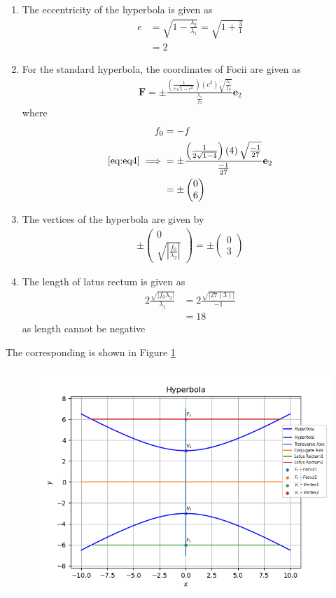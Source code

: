 \documentclass[12pt]{article}
\providecommand{\brak}[1]{\ensuremath{\left(#1\right)}}
\providecommand{\abs}[1]{\left\vert#1\right\vert}
\newcommand{\myvec}[1]{\ensuremath{\begin{pmatrix}#1\end{pmatrix}}}
\let\vec\mathbf
\begin{document}
\begin{enumerate}
\item The eccentricity of the hyperbola is given as
\begin{align}
	e &= \sqrt{1 - \frac{\lambda_2}{\lambda_1}} = \sqrt{1+\frac{3}{1}}\\
	  &= 2
\end{align}
\item For the standard hyperbola, the coordinates of Focii are given as
\begin{align}
	\label{eq:eq4}
	\vec{F} = \pm \frac{\brak{\frac{1}{e\sqrt{1-e^2}}}\brak{e^2}\sqrt{\frac{\lambda_1}{f_0}}}{\frac{\lambda_1}{f_0}} \vec{e}_2
\end{align}
where
\begin{align}
	f_0 &= -f\\
	\eqref{eq:eq4} \implies &= \pm \frac{\brak{\frac{1}{2\sqrt{1-4}}}\brak{4}\sqrt{\frac{-1}{27}}}{\frac{-1}{27}} \vec{e}_2\\
	&= \pm \myvec{0\\6}
\end{align}
\item The vertices of the hyperbola are given by
\begin{align}
	\pm \myvec{0\\\sqrt{\abs{\frac{f_0}{\lambda_2}}}}= \pm \myvec{0\\3}
\end{align}
\item The length of latus rectum is given as
\begin{align}
	2\frac{\sqrt{\abs{f_0 \lambda_2}}}{\lambda_1} &= 2\frac{\sqrt{\abs{27\brak{3}}}}{-1}\\
	&= 18
\end{align}
as length cannot be negative
\end{enumerate}
The corresponding is shown in Figure \ref{fig:Fig1}
\begin{figure}[!h]
	\begin{center} 
	    \includegraphics[width=\columnwidth]{figs/hyperbola}
	\end{center}
\caption{}
\label{fig:Fig1}
\end{figure}
\end{document}
